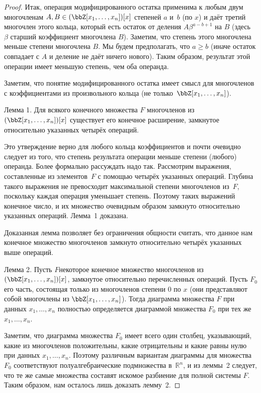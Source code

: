 \begin{proof}
Итак, операция модифицированного остатка применима к любым двум
многочленам $A,B\hm\in(\bbZ[x_1,\dots,x_n])[x]$ степеней $a$
и~$b$ (по $x$) и даёт третий многочлен этого кольца, который
есть остаток от деления $A\beta^{a-b+1}$ на $B$ (здесь~$\beta$\т
старший коэффициент многочлена $B$). Заметим, что степень этого
многочлена меньше степени многочлена $B$. Мы будем предполагать,
что $a\ge b$ (иначе остаток совпадает с $A$ и деление не даёт
ничего нового). Таким образом, результат этой операции имеет
меньшую степень, чем оба операнда.

Заметим, что понятие модифицированного ос\-та\-т\-ка
имеет смысл для многочленов с коэффициентами из произвольного
кольца (не только~$\bbZ[x_1,\dots,x_n]$).

\textsf{Лемма 1}. Для всякого конечного множества $F$
многочленов из $(\bbZ[x_1,\dots,x_n])[x]$ существует его
конечное расширение, замкнутое относительно указанных четырёх
операций.

Это утверждение верно для любого кольца
коэффициентов и почти очевидно следует из
того, что степень результата операции меньше степени (любого)
операнда. Более формально рассуждать надо так. Рассмотрим
выражения, составленные из элементов~$F$ с помощью четырёх
указанных операций. Глубина такого выражения не превосходит
максимальной степени многочленов из~$F$, поскольку каждая
операция уменьшает степень. Поэтому таких выражений конечное
число, и их множество очевидным образом замкнуто относительно
указанных операций. Лемма~1 доказана.

Доказанная лемма позволяет без ограничения общности считать, что
данное нам конечное множество многочленов замкнуто относительно
четырёх указанных выше операций.

\textsf{Лемма 2}. Пусть $F$\т некоторое конечное множество многочленов из
$(\bbZ[x_1,\dots,x_n])[x]$, замкнутое относительно перечисленных
операций. Пусть $F_0$\т его часть, состоящая только из многочленов
степени $0$ по $x$ (они представляют собой многочлены
из $\bbZ[x_1,\dots,x_n]$). Тогда диаграмма множества $F$
при данных $x_1,\dots,x_n$ полностью определяется диаграммой
множества $F_0$ при тех же $x_1,\dots,x_n$.

Заметим, что диаграмма множества $F_0$ имеет всего один столбец,
указывающий, какие из многочленов положительны, какие
отрицательны и какие равны нулю при данных $x_1,\dots,x_n$.
Поэтому различным вариантам диаграммы для множества $F_0$
соответствуют полуалгебраические подмножества в~$\mathbb{R}^n$,
и из леммы~2 следует, что те же самые множества составят искомое
разбиение для полной системы $F$. Таким образом, нам осталось
лишь доказать лемму~2.


\end{proof}
